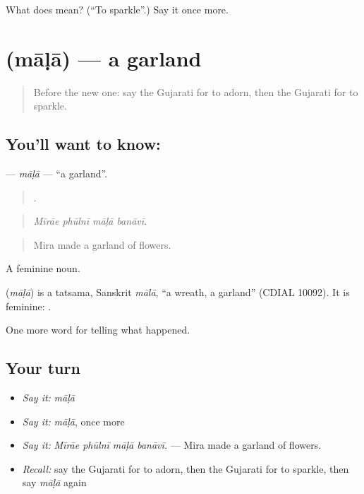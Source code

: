 \begin{tcolorbox}[breakable,colback=teal!4,colframe=teal!35!black,title={Before you move on}]
What does  mean? (\textquotedblleft{}To sparkle\textquotedblright{}.) Say it once more.
\end{tcolorbox}
\section[\texorpdfstring{\gu{માળા} (māḷā)}{માળા (māḷā)}]{ (māḷā) — a garland}

\label{lesson:GU-C329-mala}



\begin{quote}
Before the new one: say the Gujarati for to adorn, then the Gujarati for to sparkle.
\end{quote}

\subsection*{You'll want to know: }
\textbf{} — \emph{māḷā} — \textquotedblleft{}a garland\textquotedblright{}.

\begin{quote}
   .
\end{quote}

\begin{quote}
\emph{Mīrāe phūlnī māḷā banāvī.}
\end{quote}

\begin{quote}
Mira made a garland of flowers.
\end{quote}

A feminine noun.

\begin{cousinweb}
\textbf{} (\emph{māḷā}) is a tatsama, Sanskrit \emph{mālā}, \textquotedblleft{}a wreath, a garland\textquotedblright{} (CDIAL 10092). It is feminine: \textbf{ }.
\end{cousinweb}

\begin{grammarlens}[title={What you've built}]
One more word for telling what happened.
\end{grammarlens}

\subsection*{Your turn}
\begin{itemize}
\raggedright
  \item \emph{Say it:} \emph{māḷā}
  \item \emph{Say it:} \emph{māḷā}, once more
  \item \emph{Say it:} \emph{Mīrāe phūlnī māḷā banāvī.} — Mira made a garland of flowers.
  \item \emph{Recall:} say the Gujarati for to adorn, then the Gujarati for to sparkle, then say \emph{māḷā} again
\end{itemize}

